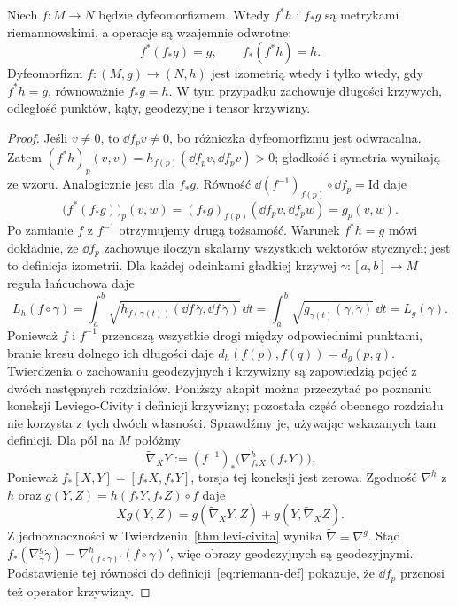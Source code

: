 \begin{stwierdzenie}
\label{prop:metryka-dyfeo-izometria}
Niech $f:M\to N$ będzie dyfeomorfizmem.
Wtedy $f^*h$ i $f_*g$ są metrykami riemannowskimi,
a operacje są wzajemnie odwrotne:
\[
 f^*(f_*g)=g,\qquad f_*(f^*h)=h.
\]
Dyfeomorfizm $f:(M,g)\to(N,h)$ jest izometrią
wtedy i tylko wtedy, gdy $f^*h=g$, równoważnie
$f_*g=h$. W tym przypadku zachowuje długości krzywych,
odległość punktów, kąty, geodezyjne i tensor krzywizny.
\end{stwierdzenie}
\begin{proof}
Jeśli $v\ne0$, to $\dd f_pv\ne0$, bo różniczka
dyfeomorfizmu jest odwracalna. Zatem
$(f^*h)_p(v,v)=h_{f(p)}(\dd f_pv,\dd f_pv)>0$;
gładkość i symetria wynikają ze wzoru.
Analogicznie jest dla $f_*g$. Równość
$\dd(f^{-1})_{f(p)}\circ\dd f_p=\mathrm{Id}$ daje
\[
 \bigl(f^*(f_*g)\bigr)_p(v,w)
 =(f_*g)_{f(p)}(\dd f_pv,\dd f_pw)
 =g_p(v,w).
\]
Po zamianie $f$ z $f^{-1}$ otrzymujemy drugą
tożsamość. Warunek $f^*h=g$ mówi dokładnie, że
$\dd f_p$ zachowuje iloczyn skalarny wszystkich
wektorów stycznych; jest to definicja izometrii.
Dla każdej odcinkami gładkiej krzywej $\gamma:[a,b]\to M$
reguła łańcuchowa daje
\[
 L_h(f\circ\gamma)
 =\int_a^b\sqrt{h_{f(\gamma(t))}
             (\dd f\,\dot\gamma,\dd f\,\dot\gamma)}\,\dd t
 =\int_a^b\sqrt{g_{\gamma(t)}
             (\dot\gamma,\dot\gamma)}\,\dd t
 =L_g(\gamma).
\]
Ponieważ $f$ i $f^{-1}$ przenoszą wszystkie drogi
między odpowiednimi punktami, branie kresu dolnego
ich długości daje $d_h(f(p),f(q))=d_g(p,q)$.
Twierdzenia o zachowaniu geodezyjnych i krzywizny są
zapowiedzią pojęć z dwóch następnych rozdziałów.
Poniższy akapit można przeczytać po poznaniu koneksji
Leviego-Civity i definicji krzywizny; pozostała część
obecnego rozdziału nie korzysta z tych dwóch własności.
Sprawdźmy je, używając wskazanych tam definicji. Dla pól na $M$ połóżmy
\[
 \widetilde\nabla_XY
 :=(f^{-1})_*\bigl(\nabla^h_{f_*X}(f_*Y)\bigr).
\]
Ponieważ $f_*[X,Y]=[f_*X,f_*Y]$, torsja tej
koneksji jest zerowa. Zgodność $\nabla^h$ z $h$
oraz $g(Y,Z)=h(f_*Y,f_*Z)\circ f$ daje
\[
 Xg(Y,Z)=g(\widetilde\nabla_XY,Z)
             +g(Y,\widetilde\nabla_XZ).
\]
Z jednoznaczności w Twierdzeniu~\ref{thm:levi-civita}
wynika $\widetilde\nabla=\nabla^g$. Stąd
$f_*(\nabla^g_{\dot\gamma}\dot\gamma)
=\nabla^h_{(f\circ\gamma)'}(f\circ\gamma)'$,
więc obrazy geodezyjnych są geodezyjnymi.
Podstawienie tej równości do definicji~\eqref{eq:riemann-def}
pokazuje, że $\dd f_p$ przenosi też operator krzywizny.
\end{proof}

